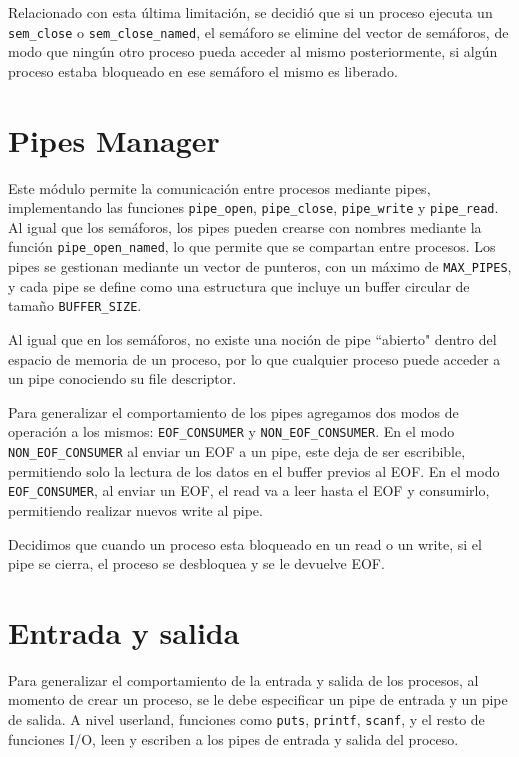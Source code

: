 \documentclass{article}
\begin{document}
Relacionado con esta última limitación, se decidió que si un proceso ejecuta un \texttt{sem\_close} o \texttt{sem\_close\_named}, el semáforo se elimine del vector de semáforos, de modo que ningún otro proceso pueda acceder al mismo posteriormente, si algún proceso estaba bloqueado en ese semáforo el mismo es liberado. 

\section{Pipes Manager}
Este módulo permite la comunicación entre procesos mediante pipes, implementando las funciones \texttt{pipe\_open}, \texttt{pipe\_close}, \texttt{pipe\_write} y \texttt{pipe\_read}. Al igual que los semáforos, los pipes pueden crearse con nombres mediante la función \texttt{pipe\_open\_named}, lo que permite que se compartan entre procesos. Los pipes se gestionan mediante un vector de punteros, con un máximo de \texttt{MAX\_PIPES}, y cada pipe se define como una estructura que incluye un buffer circular de tamaño \texttt{BUFFER\_SIZE}.

Al igual que en los semáforos, no existe una noción de pipe ``abierto" dentro del espacio de memoria de un proceso, por lo que cualquier proceso puede acceder a un pipe conociendo su file descriptor.

Para generalizar el comportamiento de los pipes agregamos dos modos de operación a los mismos: \texttt{EOF\_CONSUMER} y  \texttt{NON\_EOF\_CONSUMER}. En el modo \texttt{NON\_EOF\_CONSUMER} al enviar un EOF a un pipe, este deja de ser escribible, permitiendo solo la lectura de los datos en el buffer previos al EOF. En el modo \texttt{EOF\_CONSUMER}, al enviar un EOF, el read va a leer hasta el EOF y consumirlo, permitiendo realizar nuevos write al pipe.

Decidimos que cuando un proceso esta bloqueado en un read o un write, si el pipe se cierra, el proceso se desbloquea y se le devuelve EOF.

\section {Entrada y salida}
Para generalizar el comportamiento de la entrada y salida de los procesos, al momento de crear un proceso, se le debe especificar un pipe de entrada y un pipe de salida. A nivel userland, funciones como \texttt{puts}, \texttt{printf}, \texttt{scanf}, y el resto de funciones I/O, leen y escriben a los pipes de entrada y salida del proceso.
\end{document}
